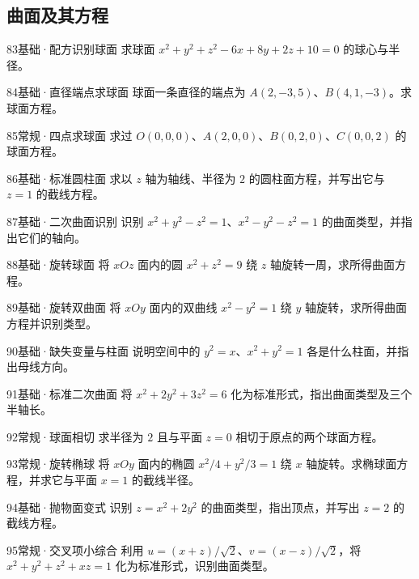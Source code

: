 \subsection{曲面及其方程}
\begin{exercise}{83}{基础·配方识别球面}
求球面 $x^2+y^2+z^2-6x+8y+2z+10=0$ 的球心与半径。
\end{exercise}
\begin{exercise}{84}{基础·直径端点求球面}
球面一条直径的端点为 $A(2,-3,5)$、$B(4,1,-3)$。求球面方程。
\end{exercise}
\begin{exercise}{85}{常规·四点求球面}
求过 $O(0,0,0)$、$A(2,0,0)$、$B(0,2,0)$、$C(0,0,2)$ 的球面方程。
\end{exercise}
\begin{exercise}{86}{基础·标准圆柱面}
求以 $z$ 轴为轴线、半径为 $2$ 的圆柱面方程，并写出它与 $z=1$ 的截线方程。
\end{exercise}
\begin{exercise}{87}{基础·二次曲面识别}
识别 $x^2+y^2-z^2=1$、$x^2-y^2-z^2=1$ 的曲面类型，并指出它们的轴向。
\end{exercise}
\begin{exercise}{88}{基础·旋转球面}
将 $xOz$ 面内的圆 $x^2+z^2=9$ 绕 $z$ 轴旋转一周，求所得曲面方程。
\end{exercise}
\begin{exercise}{89}{基础·旋转双曲面}
将 $xOy$ 面内的双曲线 $x^2-y^2=1$ 绕 $y$ 轴旋转，求所得曲面方程并识别类型。
\end{exercise}
\begin{exercise}{90}{基础·缺失变量与柱面}
说明空间中的 $y^2=x$、$x^2+y^2=1$ 各是什么柱面，并指出母线方向。
\end{exercise}
\begin{exercise}{91}{基础·标准二次曲面}
将 $x^2+2y^2+3z^2=6$ 化为标准形式，指出曲面类型及三个半轴长。
\end{exercise}
\begin{exercise}{92}{常规·球面相切}
求半径为 $2$ 且与平面 $z=0$ 相切于原点的两个球面方程。
\end{exercise}
\begin{exercise}{93}{常规·旋转椭球}
将 $xOy$ 面内的椭圆 $x^2/4+y^2/3=1$ 绕 $x$ 轴旋转。求椭球面方程，并求它与平面 $x=1$ 的截线半径。
\end{exercise}
\begin{exercise}{94}{基础·抛物面变式}
识别 $z=x^2+2y^2$ 的曲面类型，指出顶点，并写出 $z=2$ 的截线方程。
\end{exercise}
\begin{exercise}{95}{常规·交叉项小综合}
利用 $u=(x+z)/\sqrt2$、$v=(x-z)/\sqrt2$，将 $x^2+y^2+z^2+xz=1$ 化为标准形式，识别曲面类型。
\end{exercise}
